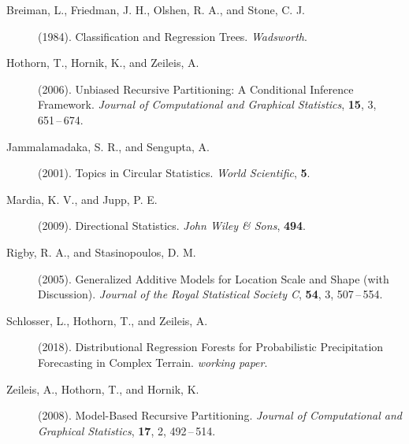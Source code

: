 \documentclass[twoside]{report}
\begin{document}
\begin{description}

\item[Breiman, L., Friedman, J. H., Olshen, R. A., and Stone, C. J.] (1984).
     Classification and Regression Trees.
     {\it Wadsworth}.

\item[Hothorn, T., Hornik, K., and Zeileis, A.] (2006).
     Unbiased Recursive Partitioning: A Conditional Inference Framework.
     {\it Journal of Computational and Graphical Statistics}, {\bf 15}, 3,
     651\,--\,674. 

\item[Jammalamadaka, S. R., and Sengupta, A.] (2001).
     Topics in Circular Statistics.
     {\it World Scientific}, {\bf 5}. 

\item[Mardia, K. V., and Jupp, P. E.] (2009).
     Directional Statistics.
     {\it John Wiley \& Sons}, {\bf 494}. 

\item[Rigby, R. A., and Stasinopoulos, D. M.] (2005).
     Generalized Additive Models for Location Scale and Shape (with Discussion).
     {\it Journal of the Royal Statistical Society C}, {\bf 54}, 3,
     507\,--\,554.

\item[Schlosser, L., Hothorn, T., and Zeileis, A.] (2018).
     Distributional Regression Forests for Probabilistic Precipitation Forecasting in Complex Terrain.
     {\it working paper}.

\item[Zeileis, A., Hothorn, T., and Hornik, K.] (2008).
     Model-Based Recursive Partitioning.
     {\it Journal of Computational and Graphical Statistics}, {\bf 17}, 2,
     492\,--\,514. 
     

\end{description}
\end{document}

